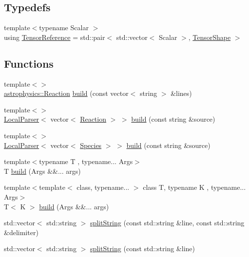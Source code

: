 \subsection*{Typedefs}
\begin{DoxyCompactItemize}
\item 
{\footnotesize template$<$typename Scalar $>$ }\\using \hyperlink{a00171_a1bf491fd1c876e2808648b2fd291e3dd}{Tensor\+Reference} = std\+::pair$<$ std\+::vector$<$ Scalar $>$, \hyperlink{a00850}{Tensor\+Shape} $>$
\end{DoxyCompactItemize}
\subsection*{Functions}
\begin{DoxyCompactItemize}
\item 
{\footnotesize template$<$$>$ }\\\hyperlink{a00734}{astrophysics\+::\+Reaction} \hyperlink{a00171_abca66b4f2a1543308b663714bd8b4855}{build} (const vector$<$ string $>$ \&lines)
\item 
{\footnotesize template$<$$>$ }\\\hyperlink{a00778}{Local\+Parser}$<$ vector$<$ \hyperlink{a00734}{Reaction} $>$ $>$ \hyperlink{a00171_aaf82cc265522a41ebc36e8405e0c7559}{build} (const string \&source)
\item 
{\footnotesize template$<$$>$ }\\\hyperlink{a00778}{Local\+Parser}$<$ vector$<$ \hyperlink{a00742}{Species} $>$ $>$ \hyperlink{a00171_a138f22945f7a7ec642432fd24a94b414}{build} (const string \&source)
\item 
{\footnotesize template$<$typename T , typename... Args$>$ }\\T \hyperlink{a00171_ac7deda7dc809d0d45b8bfed78c8232f9}{build} (Args \&\&... args)
\item 
{\footnotesize template$<$template$<$ class, typename... $>$ class T, typename K , typename... Args$>$ }\\T$<$ K $>$ \hyperlink{a00171_a6b760990569b5c37dc8db51881ae9646}{build} (Args \&\&... args)
\item 
std\+::vector$<$ std\+::string $>$ \hyperlink{a00171_ac3f0360fae13ec5b8b93251c695e1821}{split\+String} (const std\+::string \&line, const std\+::string \&delimiter)
\item 
std\+::vector$<$ std\+::string $>$ \hyperlink{a00171_afe6f0aa2af9238d6a4e0c47c6ad4caa5}{split\+String} (const std\+::string \&line)

\end{DoxyCompactItemize}
